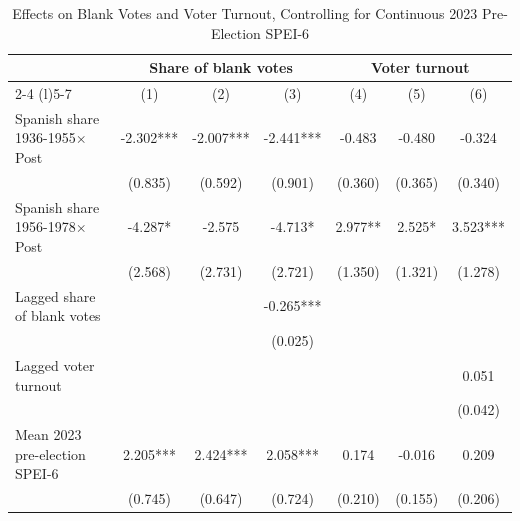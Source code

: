 \begin{table}[!h]
\caption{Effects on Blank Votes and Voter Turnout, Controlling for Continuous 2023 Pre-Election SPEI-6}
\renewcommand{\arraystretch}{1.25}
\setlength{\tabcolsep}{6pt}
\centering
\begin{tabular}[t]{lcccccc}
\hline
 & \multicolumn{3}{c}{Share of blank votes} & \multicolumn{3}{c}{Voter turnout} \\
\cmidrule(l){2-4} \cmidrule(l){5-7}
  & (1) & (2) & (3) & (4) & (5) & (6)\\
\hline
Spanish share 1936-1955$\times$Post & -2.302*** & -2.007*** & -2.441*** & -0.483 & -0.480 & -0.324\\
 & (0.835) & (0.592) & (0.901) & (0.360) & (0.365) & (0.340)\\
Spanish share 1956-1978$\times$Post & -4.287* & -2.575 & -4.713* & 2.977** & 2.525* & 3.523***\\
 & (2.568) & (2.731) & (2.721) & (1.350) & (1.321) & (1.278)\\
Lagged share of blank votes &  &  & -0.265*** &  &  & \\
 &  &  & (0.025) &  &  & \\
Lagged voter turnout &  &  &  &  &  & 0.051\\
 &  &  &  &  &  & (0.042)\\
Mean 2023 pre-election SPEI-6 & 2.205*** & 2.424*** & 2.058*** & 0.174 & -0.016 & 0.209\\
 & (0.745) & (0.647) & (0.724) & (0.210) & (0.155) & (0.206)\\


\end{tabular}
\end{table}
